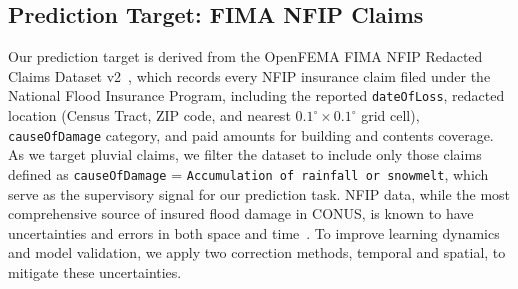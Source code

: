 \subsection{Prediction Target: FIMA NFIP Claims}
Our prediction target is derived from the OpenFEMA FIMA NFIP Redacted Claims Dataset v2~\cite{fema_nfip_claims_v2}, which records every NFIP insurance claim filed under the National Flood Insurance Program, including the reported \texttt{dateOfLoss}, redacted location (Census Tract, ZIP code, and nearest $0.1^{\circ}\times 0.1^{\circ}$ grid cell), \texttt{causeOfDamage} category, and paid amounts for building and contents coverage.
%
As we target pluvial claims, we filter the dataset to include only those claims defined as \texttt{causeOfDamage} = \texttt{Accumulation of rainfall or snowmelt}, which serve as the supervisory signal for our prediction task.
%
NFIP data, while the most comprehensive source of insured flood damage in CONUS, is known to have uncertainties and errors in both space and time~\cite{wing_new_2020,petkov_learning_2025,shin_systematic_2022}.
%
To improve learning dynamics and model validation, we apply two correction methods, temporal and spatial, to mitigate these uncertainties.


